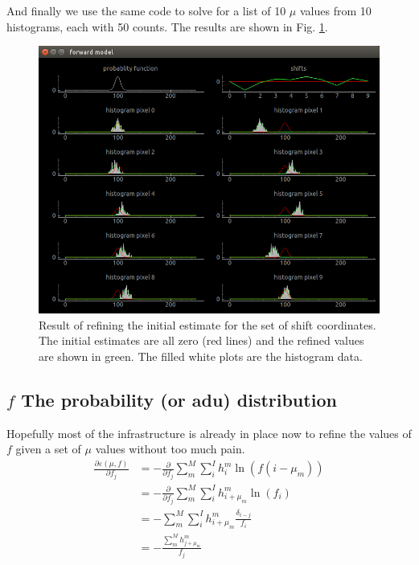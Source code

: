 \documentclass[11pt]{article}
\begin{document}
And finally we use the same code to solve for a list of 10 $\mu$ values from 10 histograms, each with 50 counts. The results are shown in Fig. \ref{more_mus}.
\begin{figure}[htp]
\centering
\includegraphics[scale=0.50]{figure_5.png}
\caption{Result of refining the initial estimate for the set of shift coordinates. The initial estimates are all zero (red lines) and the refined values are shown in green. The filled white plots are the histogram data. }
\label{more_mus}
\end{figure}





\subsection{$f$ The probability (or adu) distribution}
Hopefully most of the infrastructure is already in place now to refine the values of $f$ given a set of $\mu$ values without too much pain.  
\begin{align}
   \frac{\partial \varepsilon(\mu, f)}{\partial f_j} &= -\frac{\partial}{\partial f_j} \sum_m^M \sum_i^I h^m_i \ln(f(i - \mu_m)) \\
   &= -\frac{\partial}{\partial f_j} \sum_m^M \sum_i^I h^m_{i+\mu_m} \ln(f_i) \\
   &= -\sum_m^M \sum_i^I h^m_{i+\mu_m} \frac{\delta_{i-j}}{f_i} \\
   &= -\frac{\sum_m^M h^m_{j+\mu_m}}{f_j}
\end{align}
\end{document}
